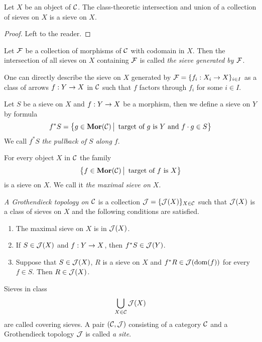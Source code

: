 \begin{fact}\label{fact:propertiesofsieves}
Let $X$ be an object of ${\mathcal C}$. The class-theoretic intersection and union of a collection of sieves on $X$ is a sieve on $X$.
\end{fact}
\begin{proof}
Left to the reader.
\end{proof}

\begin{definition}
Let ${\mathcal F}$ be a collection of morphisms of ${\mathcal C}$ with codomain in $X$. Then the intersection of all sieves on $X$ containing ${\mathcal F}$ is called \textit{the sieve generated by ${\mathcal F}$}.
\end{definition}
\noindent
One can directly describe the sieve on $X$ generated by ${\mathcal F} = \{f_i:X_i\rightarrow X\}_{i\in I}$ as a class of arrows $f:Y\rightarrow X$ in ${\mathcal C}$ such that $f$ factors through $f_i$ for some $i\in I$. 

\begin{definition}
Let $S$ be a sieve on $X$ and $f:Y\rightarrow X$ be a morphism, then we define a sieve on $Y$ by formula
$$f^*S=\big\{g\in \mathbf{Mor}({\mathcal C})\,\big|\,\mbox{ target of }g\mbox{ is }Y\mbox{ and }f\cdot g\in S\big\}$$
We call $f^*S$ \textit{the pullback of $S$ along $f$}.
\end{definition}

\begin{definition}
For every object $X$ in ${\mathcal C}$ the family 
$$\big\{f\in \mathbf{Mor}({\mathcal C})\,\big|\,\mbox{ target of }f\mbox{ is }X\big\}$$
is a sieve on $X$. We call it \textit{the maximal sieve on $X$}.
\end{definition}
 
\begin{definition}
\textit{A Grothendieck topology on ${\mathcal C}$} is a collection ${\mathcal J}=\{{\mathcal J}(X)\}_{X\in {\mathcal C}}$ such that ${\mathcal J}(X)$ is a class of sieves on $X$ and the following conditions are satisfied. 
\begin{enumerate}[label=\textbf{(\arabic*)}, leftmargin=1.5em]
\item The maximal sieve on $X$ is in ${\mathcal J}(X)$.
\item If $S\in {\mathcal J}(X)$ and $f:Y\rightarrow X$, then $f^*S\in {\mathcal J}(Y)$.
\item Suppose that $S\in {\mathcal J}(X)$, $R$ is a sieve on $X$ and $f^*R\in {\mathcal J}(\mathrm{dom}(f))$ for every $f\in S$. Then $R\in {\mathcal J}(X)$.
\end{enumerate}
Sieves in class
$$\bigcup_{X\in {\mathcal C}}{\mathcal J}(X)$$
are called covering sieves. A pair $({\mathcal C},{\mathcal J})$ consisting of a category ${\mathcal C}$ and a Grothendieck topology ${\mathcal J}$ is called \textit{a site}.
\end{definition}

